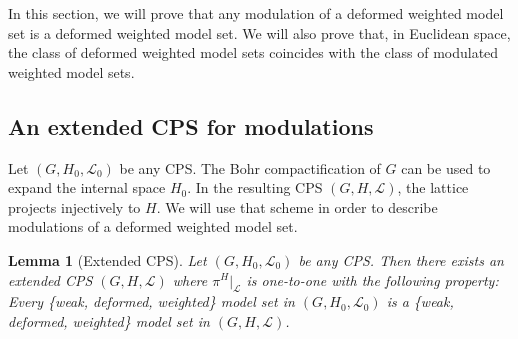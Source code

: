 \documentclass[11pt, a4wide]{amsart}
\newcommand{\cL}{\mathcal L}
\newtheorem{lemma}{Lemma}
\numberwithin{lemma}{section}
\begin{document}
In this section, we will prove that any modulation of a deformed weighted model set is a deformed weighted model set. We will also prove that, in Euclidean space, the class of deformed  weighted model sets coincides with the class of modulated weighted model sets.



\subsection{An extended CPS for modulations} Let $(G, H_0,\mathcal L_0)$ be any CPS. The Bohr compactification of $G$ can be used to expand the internal space $H_0$. In the resulting CPS $(G,H,\mathcal L)$, the lattice projects injectively to $H$. We will use that scheme in order to describe modulations of a deformed weighted model set.


\begin{lemma}[Extended CPS]\label{lem:excp} Let $(G,H_0,\cL_0)$ be any CPS. Then there exists an extended CPS $(G, H, \mathcal L)$ where $\pi^H|_{\mathcal L}$ is one-to-one with the following property:  Every \{weak, deformed, weighted\} model set in $(G,H_0,\mathcal L_0)$ is a \{weak, deformed, weighted\} model set in $(G, H, \mathcal L)$.
\end{lemma}
\end{document}
